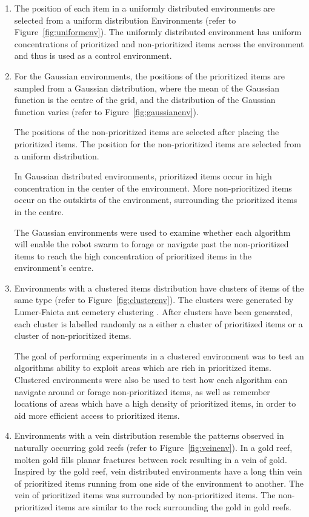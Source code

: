 \begin{enumerate}

\item The position of each item in a uniformly distributed environments are selected from a uniform distribution Environments (refer to Figure~\ref{fig:uniformenv}). The uniformly distributed environment has uniform concentrations of prioritized and non-prioritized items across the environment and thus is used as a control environment. 

\item For the Gaussian environments, the positions of the prioritized items are sampled from a Gaussian distribution, where the mean of the Gaussian function is the centre of the grid, and the distribution of the Gaussian function varies (refer to Figure~\ref{fig:gaussianenv}).

The positions of the non-prioritized items are selected after placing the prioritized items. The position for the non-prioritized items are selected from a uniform distribution. 

In Gaussian distributed environments, prioritized items  occur in high concentration in the center of the environment. More non-prioritized items occur on the outskirts of the environment, surrounding the prioritized items in the centre.

The Gaussian environments were used to examine whether each algorithm will enable the robot swarm to forage or navigate past the non-prioritized items to reach the high concentration of prioritized items in the environment's centre. 

\item Environments with a clustered items distribution have clusters of items of the same type (refer to Figure~\ref{fig:clusterenv}). The clusters were generated by Lumer-Faieta ant cemetery clustering \cite{lumer1994diversity}. After clusters have been generated, each cluster is labelled randomly as a either a cluster of prioritized items or a cluster of non-prioritized items. 

The goal of performing experiments in a clustered environment was to test an algorithms ability to exploit areas which are rich in prioritized items. Clustered environments were also be used to test how each algorithm can navigate around or forage non-prioritized items, as well as remember locations of areas which have a high density of prioritized items, in order to aid more efficient access to prioritized items. 

\item Environments with a vein distribution resemble the patterns observed in naturally occurring gold reefs \cite{frimmel2002recent} (refer to Figure~\ref{fig:veinenv}). In a gold reef, molten gold fills planar fractures between rock resulting in a vein of gold. Inspired by the gold reef, vein distributed environments have a long thin vein of prioritized items running from one side of the environment to another. The vein of prioritized items was surrounded by non-prioritized items. The non-prioritized items are similar to the rock surrounding the gold in gold reefs.


\end{enumerate}
